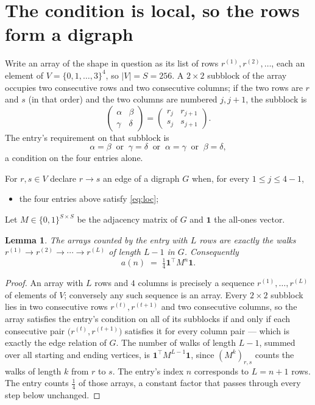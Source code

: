 \documentclass[11pt,a4paper]{article}
\theoremstyle{plain}
\newtheorem{lemma}[theorem]{Lemma}
\theoremstyle{definition}
\begin{document}
\section{The condition is local, so the rows form a digraph}

Write an array of the shape in question as its list of rows
$r^{(1)},r^{(2)},\dots$, each an element of
$V=\{0,1,\dots,3\}^{4}$, so $|V|=S=256$. A $2\times2$ subblock of the array
occupies two consecutive rows and two consecutive columns; if the two rows are $r$
and $s$ (in that order) and the two columns are numbered $j,j+1$,
the subblock is
\[
\begin{pmatrix}\alpha&\beta\\\gamma&\delta\end{pmatrix}=\begin{pmatrix}r_j&r_{j+1}\\s_j&s_{j+1}\end{pmatrix}.
\]
The entry's requirement on that subblock is
\begin{equation}\label{eq:loc}
\alpha=\beta\ \text{ or }\ \gamma=\delta\ \text{ or }\ \alpha=\gamma\ \text{ or }\ \beta=\delta,
\end{equation}
a condition on the four entries alone.

For $r,s\in V$ declare $r\to s$ an edge of a digraph $G$ when, for every
$1\le j\le 4-1$,
\begin{itemize}
\item the four entries above satisfy \eqref{eq:loc};

\end{itemize}
Let $M\in\{0,1\}^{S\times S}$ be the adjacency matrix of $G$ and $\mathbf{1}$ the
all-ones vector.

\begin{lemma}\label{lem:walk}
The arrays counted by the entry with $L$ rows are exactly the walks
$r^{(1)}\to r^{(2)}\to\cdots\to r^{(L)}$ of length $L-1$ in $G$. Consequently
\[
a(n)\;=\;\tfrac1{4}\mathbf{1}^{\!\top}M^{n}\mathbf{1} .
\]
\end{lemma}

\begin{proof}
An array with $L$ rows and $4$ columns is precisely a sequence
$r^{(1)},\dots,r^{(L)}$ of elements of $V$; conversely any such sequence is an array.
Every $2\times2$ subblock lies in two consecutive rows $r^{(t)},r^{(t+1)}$ and two
consecutive columns, so the array satisfies the entry's condition on all of its subblocks
if and only if each consecutive pair $\bigl(r^{(t)},r^{(t+1)}\bigr)$ satisfies it for
every column pair --- which is exactly the edge relation of $G$. The number of walks of
length $L-1$, summed over all starting and ending vertices, is
$\mathbf{1}^{\!\top}M^{L-1}\mathbf{1}$, since $(M^{k})_{r,s}$ counts the walks of
length $k$ from $r$ to $s$. The entry's index $n$ corresponds to $L=n+1$ rows. The entry counts $\tfrac1{4}$ of those arrays, a constant factor that passes through every step below unchanged.
\end{proof}
\end{document}
